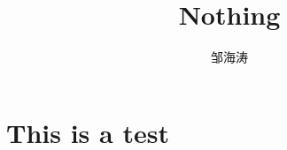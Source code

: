 \documentclass[12pt]{mathnotes}
\title{Nothing}
\author{邹海涛}
\begin{document}
\maketitle
\section{This is a test}
\end{document}
